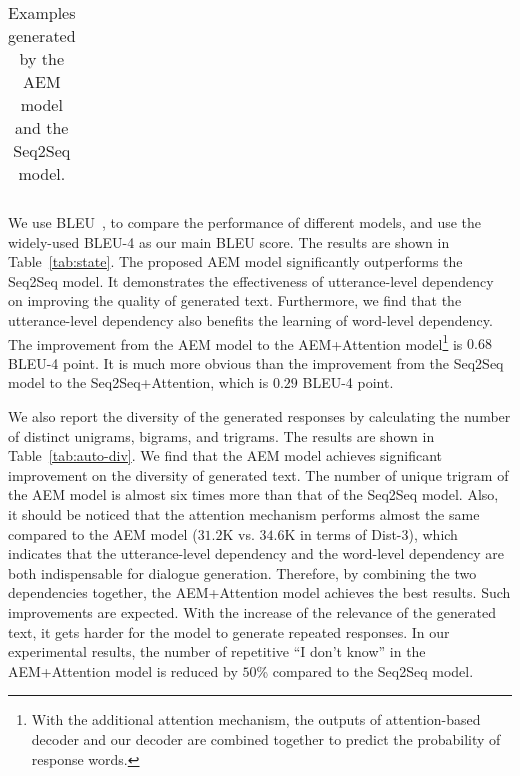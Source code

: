 \documentclass[11pt,a4paper]{article}
\begin{document}
\begin{CJK}{UTF8}{song}
\begin{table}[t]
\begin{tabular}{p{0.9\linewidth}}
    
\end{tabular}
    \caption{Examples generated by the AEM model and the Seq2Seq model. }
    \label{samplecases}
\end{table}









We use BLEU~\cite{DBLP:conf/acl/PapineniRWZ02}, to compare the performance of different models, and use the widely-used BLEU-4 as our main BLEU score. The results are shown in Table~\ref{tab:state}.
The proposed AEM model significantly outperforms the Seq2Seq model.
It demonstrates the effectiveness of utterance-level dependency on improving the quality of generated text. Furthermore, we find that the utterance-level dependency also benefits the learning of word-level dependency. 
The improvement from the AEM model to the AEM+Attention model\footnote{With the additional attention mechanism, the outputs of attention-based decoder and our decoder are combined together to predict the probability of response words.} is $0.68$ BLEU-4 point. It is much more obvious than the improvement from the Seq2Seq model to the Seq2Seq+Attention, which is $0.29$ BLEU-4 point. 















We also report the diversity of the generated responses by calculating the number of distinct unigrams, bigrams, and trigrams. The results are shown in Table~\ref{tab:auto-div}. We find that the AEM model achieves significant improvement on the diversity of generated text. The number of unique trigram of the AEM model is almost six times more than that of the Seq2Seq model. Also, it should be noticed that the attention mechanism performs almost the same compared to the AEM model ($31.2$K vs. $34.6$K in terms of Dist-3), which indicates that the utterance-level dependency and the word-level dependency are both indispensable for dialogue generation. Therefore, by combining the two dependencies together, the AEM+Attention model achieves the best results. Such improvements are expected. With the increase of the relevance of the generated text, it gets harder for the model to generate repeated responses. In our experimental results, the number of repetitive ``I don't know'' in the AEM+Attention model is reduced by $50$\% compared to the Seq2Seq model.  



\end{CJK}
\end{document}
